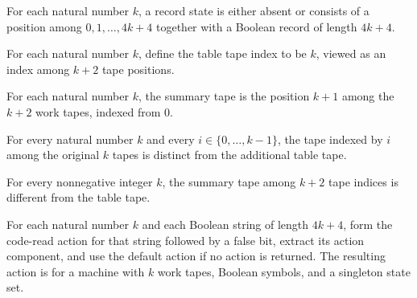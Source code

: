\begin{definition}
\label{Turing.StepBlock.RecordState}
\leanok
{}
For each natural number $k$, a record state is either absent or consists of a position
among $0,1,\ldots,4k+4$ together with a Boolean record of length $4k+4$.
\end{definition}

\begin{definition}
\label{Turing.StepBlock.tableTape}
\leanok
For each natural number $k$, define the table tape index to be $k$, viewed as an index
among $k+2$ tape positions.
\end{definition}

\begin{definition}
\label{Turing.StepBlock.summaryTape}
\leanok
For each natural number $k$, the summary tape is the position $k+1$ among the $k+2$ work
tapes, indexed from $0$.
\end{definition}

\begin{lemma}
\label{Turing.StepBlock.mirror_ne_table}
\leanok
{}
For every natural number $k$ and every $i\in\{0,\ldots,k-1\}$, the tape indexed by $i$
among the original $k$ tapes is distinct from the additional table tape.
\end{lemma}

\begin{lemma}
\label{Turing.StepBlock.summary_ne_table}
\leanok
{}
For every nonnegative integer $k$, the summary tape among $k+2$ tape indices is
different from the table tape.
\end{lemma}

\begin{definition}
\label{Turing.StepBlock.payload}
\leanok
{}
For each natural number $k$ and each Boolean string of length $4k+4$, form the code-read
action for that string followed by a false bit, extract its action component, and use
the default action if no action is returned. The resulting action is for a machine with
$k$ work tapes, Boolean symbols, and a singleton state set.
\end{definition}

